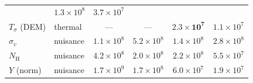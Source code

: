 \documentclass[11pt,a4paper]{article}
\newcommand{\nh}{N_{\mathrm{H}}}
\begin{document}
\begin{table}[t]
\begin{tabular}{llcccc}
                                & $1.3\times10^{8}$ & $3.7\times10^{7}$ \\
$T_\sigma$ (DEM) & thermal & --- & ---
                 & $\mathbf{2.3\times10^{7}}$ & $1.1\times10^{7}$ \\
$\sigma_v$ & nuisance & $1.1\times10^{8}$ & $5.2\times10^{8}$
                      & $1.4\times10^{8}$ & $2.8\times10^{8}$ \\
$\nh$      & nuisance & $4.2\times10^{8}$ & $2.0\times10^{8}$
                      & $2.2\times10^{8}$ & $5.5\times10^{7}$ \\
$Y$ (norm) & nuisance & $1.7\times10^{9}$ & $1.7\times10^{8}$
                      & $6.0\times10^{7}$ & $1.9\times10^{7}$ \\
\bottomrule
\end{tabular}
\end{table}
\end{document}
